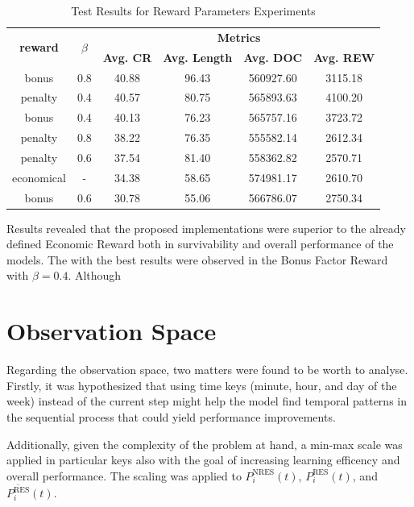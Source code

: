   \begin{table}[h!]
	\centering
	\caption{Test Results for Reward Parameters Experiments}
	\begin{tabular}{cccccc}
		\toprule
		\multirow{2}{*}{\textbf{reward}} & \multirow{2}{*}{\textbf{$\beta$}} & \multicolumn{4}{c}{\textbf{Metrics}} \\ 
		\cmidrule(lr){3-6}
		&  & \textbf{Avg. CR} & \textbf{Avg. Length} & \textbf{Avg. DOC} & \textbf{Avg. REW} \\ 
		\midrule
		bonus & 0.8 & 40.88 & 96.43 & 560927.60 & 3115.18 \\
		penalty & 0.4 & 40.57 & 80.75 & 565893.63 & 4100.20 \\
		bonus & 0.4 & 40.13 & 76.23 & 565757.16 & 3723.72  \\
		penalty & 0.8 & 38.22 & 76.35 & 555582.14 & 2612.34 \\
		penalty & 0.6 & 37.54 & 81.40 & 558362.82 & 2570.71 \\
		economical & - & 34.38 & 58.65 & 574981.17 & 2610.70 \\
		bonus & 0.6 & 30.78 & 55.06 & 566786.07 & 2750.34 \\
		\bottomrule
	\end{tabular}
	\label{tab:test-reward}
\end{table}


\par
Results revealed that the proposed implementations were superior to the already defined Economic Reward both in survivability and overall performance of the models. The with the best results were observed in the Bonus Factor Reward with $\beta = 0.4$. Although

\section{Observation Space} \label{sec:results-obs}

Regarding the observation space, two matters were found to be worth to analyse. 
Firstly, it was hypothesized that using time keys (minute, hour, and day of the week) instead of the current step might help the model find temporal patterns in the sequential process that could yield performance improvements. \par
Additionally, given the complexity of the problem at hand, a min-max scale was applied in particular keys also with the goal of increasing learning efficency and overall performance. The scaling was applied to $P^\text{NRES}_i (t)$, $P^\text{RES}_i (t)$, and $\overline{P^\text{RES}_i} (t)$. \par

